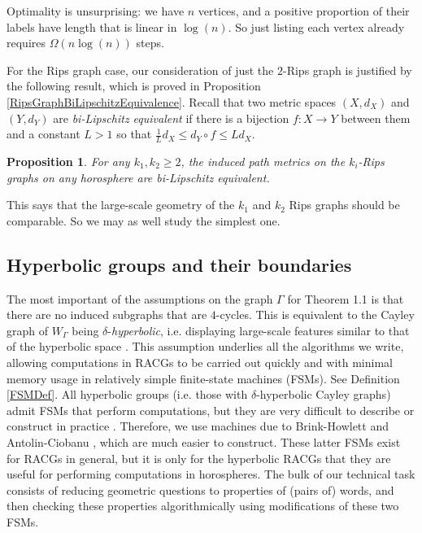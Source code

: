\documentclass{amsart}
\newtheorem{proposition}[theorem]{Proposition}
\theoremstyle{definition}
\theoremstyle{remark}
\begin{document}
	Optimality is unsurprising: we have $n$ vertices, and a positive proportion of their labels have length that is linear in $\log(n)$. So just listing each vertex already requires $\Omega(n\log(n))$ steps.
	
	For the Rips graph case, our consideration of just the $2$-Rips graph is justified by the following result, which is proved in Proposition \ref{RipsGraphBiLipschitzEquivalence}. Recall that two metric spaces $(X, d_X)$ and $(Y, d_Y)$ are \textit{bi-Lipschitz equivalent} if there is a bijection $f:X\to Y$ between them and a constant $L>1$ so that $\frac{1}{L} d_X\le d_Y\circ f\le Ld_X$.
	
	\begin{proposition}
		
		For any $k_1, k_2\ge 2$, the induced path metrics on the $k_i$-Rips graphs on any horosphere are bi-Lipschitz equivalent.
		
	\end{proposition}

        This says that the large-scale geometry of the $k_1$ and $k_2$ Rips graphs should be comparable. So we may as well study the simplest one.
    
    \subsection*{Hyperbolic groups and their boundaries}
    
        The most important of the assumptions on the graph $\Gamma$ for Theorem 1.1 is that there are no induced subgraphs that are $4$-cycles. This is equivalent to the Cayley graph of $W_\Gamma$ being $\delta$-\textit{hyperbolic}, i.e. displaying large-scale features similar to that of the hyperbolic space \cite{GromovHyperbolic,Moussong}. This assumption underlies all the algorithms we write, allowing computations in RACGs to be carried out quickly and with minimal memory usage in relatively simple finite-state machines (FSMs). See Definition \ref{FSMDef}. All hyperbolic groups (i.e. those with $\delta$-hyperbolic Cayley graphs) admit FSMs that perform computations, but they are very difficult to describe or construct in practice \cite{WordProcessing}. Therefore, we use machines due to Brink-Howlett and Antolin-Ciobanu \cite{BrinkHowlett, AntolinCiobanu}, which are much easier to construct. These latter FSMs exist for RACGs in general, but it is only for the hyperbolic RACGs that they are useful for performing computations in horospheres. The bulk of our technical task consists of reducing geometric questions to properties of (pairs of) words, and then checking these properties algorithmically using modifications of these two FSMs.
	
\end{document}
